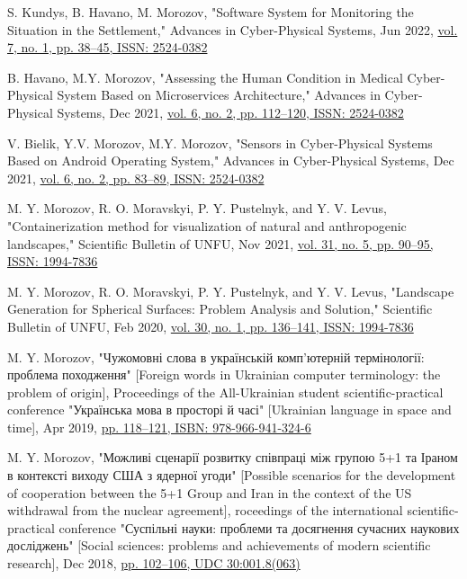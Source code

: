 \documentclass[letterpaper,10pt]{article}
\newcommand{\resumePublicationHeading}[3]{
    \item #1\href{#3}{{#2}} \vspace{-9pt}
}
\begin{document}
    \resumePublicationHeading
      {S. Kundys, B. Havano, M. Morozov, "Software System for Monitoring the Situation in the Settlement," Advances in Cyber-Physical Systems, Jun 2022, }
      {vol. 7, no. 1, pp. 38–45, ISSN: 2524-0382} 
      {https://doi.org/10.23939/acps2022.01.038}
		
    \resumePublicationHeading
      {B. Havano, M.Y. Morozov, "Assessing the Human Condition in Medical Cyber-Physical System Based on Microservices Architecture," Advances in Cyber-Physical Systems, Dec 2021, }
      {vol. 6, no. 2, pp. 112–120, ISSN: 2524-0382} 
      {https://doi.org/10.23939/acps2021.02.112}
		
    \resumePublicationHeading
      {V. Bielik, Y.V. Morozov, M.Y. Morozov, "Sensors in Cyber-Physical Systems Based on Android Operating System," Advances in Cyber-Physical Systems, Dec 2021, }
      {vol. 6, no. 2, pp. 83–89, ISSN: 2524-0382} 
      {https://doi.org/10.23939/acps2021.02.083}
		
    \resumePublicationHeading
      {M. Y. Morozov, R. O. Moravskyi, P. Y. Pustelnyk, and Y. V. Levus, "Containerization method for visualization of natural and anthropogenic landscapes," Scientific Bulletin of UNFU, Nov 2021, }
      {vol. 31, no. 5, pp. 90–95, ISSN: 1994-7836} 
      {https://doi.org/10.36930/40310514}
		
    \resumePublicationHeading
      {M. Y. Morozov, R. O. Moravskyi, P. Y. Pustelnyk, and Y. V. Levus, "Landscape Generation for Spherical Surfaces: Problem Analysis and Solution," Scientific Bulletin of UNFU, Feb 2020, }
      {vol. 30, no. 1, pp. 136–141, ISSN: 1994-7836} 
      {https://doi.org/10.36930/40300124}
		
    \resumePublicationHeading
      {M. Y. Morozov, "Чужомовні слова в українській комп’ютерній термінології: проблема походження" [Foreign words in Ukrainian computer terminology: the problem of origin], Proceedings of the All-Ukrainian student scientific-practical conference "Українська мова в просторі й часі" [Ukrainian language in space and time], Apr 2019, }
      {pp. 118–121, ISBN: 978-966-941-324-6} 
      {https://drive.google.com/open?id=1faA2TsLMxeOa-nSN0-z1pgH54bZDN5Ni}
		
    \resumePublicationHeading
      {M. Y. Morozov, "Можливі сценарії розвитку співпраці між групою 5+1 та Іраном в контексті виходу США з ядерної угоди" [Possible scenarios for the development of cooperation between the 5+1 Group and Iran in the context of the US withdrawal from the nuclear agreement], roceedings of the international scientific-practical conference "Суспільні науки: проблеми та досягнення сучасних наукових досліджень" [Social sciences: problems and achievements of modern scientific research], Dec 2018, }
      {pp. 102–106, UDC 30:001.8(063)} 
      {https://drive.google.com/open?id=1m-YbJSZyWnz2jBhtTd29ezo8TVN1qjTQ}
		
\end{document}
